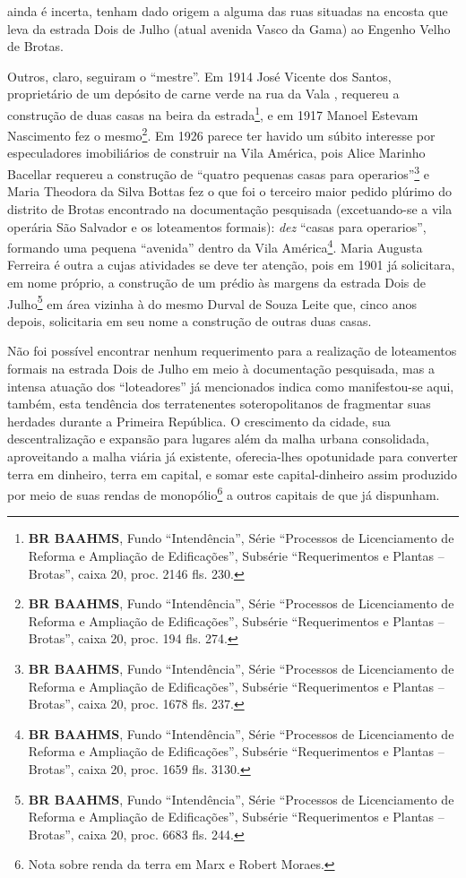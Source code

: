 ainda é incerta, tenham dado origem a alguma das ruas situadas na encosta que leva da estrada Dois de Julho (atual avenida Vasco da Gama) ao Engenho Velho de Brotas.

Outros, claro, seguiram o ``mestre''. Em 1914 José Vicente dos Santos, proprietário de um depósito de carne verde na rua da Vala \cite[p.~402]{reis_almanak_1898}, requereu a construção de duas casas na beira da estrada\footnote{\textbf{BR BAAHMS}, Fundo ``Intendência'', Série ``Processos de Licenciamento de Reforma e Ampliação de Edificações'', Subsérie ``Requerimentos e Plantas -- Brotas'', caixa 20, proc. 2146 fls. 230.}, e em 1917 Manoel Estevam Nascimento fez o mesmo\footnote{\textbf{BR BAAHMS}, Fundo ``Intendência'', Série ``Processos de Licenciamento de Reforma e Ampliação de Edificações'', Subsérie ``Requerimentos e Plantas -- Brotas'', caixa 20, proc. 194 fls. 274.}. Em 1926 parece ter havido um súbito interesse por especuladores imobiliários de construir na Vila América, pois Alice Marinho Bacellar requereu a construção de ``quatro pequenas casas para operarios''\footnote{\textbf{BR BAAHMS}, Fundo ``Intendência'', Série ``Processos de Licenciamento de Reforma e Ampliação de Edificações'', Subsérie ``Requerimentos e Plantas -- Brotas'', caixa 20, proc. 1678 fls. 237.} e Maria Theodora da Silva Bottas fez o que foi o terceiro maior pedido plúrimo do distrito de Brotas encontrado na documentação pesquisada (excetuando-se a vila operária São Salvador e os loteamentos formais): \textit{dez} ``casas para operarios'', formando uma pequena ``avenida'' dentro da Vila América\footnote{\textbf{BR BAAHMS}, Fundo ``Intendência'', Série ``Processos de Licenciamento de Reforma e Ampliação de Edificações'', Subsérie ``Requerimentos e Plantas -- Brotas'', caixa 20, proc. 1659 fls. 3130.}. Maria Augusta Ferreira é outra a cujas atividades se deve ter atenção, pois em 1901 já solicitara, em nome próprio, a construção de um prédio às margens da estrada Dois de Julho\footnote{\textbf{BR BAAHMS}, Fundo ``Intendência'', Série ``Processos de Licenciamento de Reforma e Ampliação de Edificações'', Subsérie ``Requerimentos e Plantas -- Brotas'', caixa 20, proc. 6683 fls. 244.} em área vizinha à do mesmo Durval de Souza Leite que, cinco anos depois, solicitaria em seu nome a construção de outras duas casas.


Não foi possível encontrar nenhum requerimento para a realização de loteamentos formais na estrada Dois de Julho em meio à documentação pesquisada, mas a intensa atuação dos ``loteadores'' já mencionados indica como manifestou-se aqui, também, esta tendência dos terratenentes soteropolitanos de fragmentar suas herdades durante a Primeira República. O crescimento da cidade, sua descentralização e expansão para lugares além da malha urbana consolidada, aproveitando a malha viária já existente, oferecia-lhes opotunidade para converter terra em dinheiro, terra em capital, e somar este capital-dinheiro assim produzido por meio de suas rendas de monopólio\footnote{Nota sobre renda da terra em Marx e Robert Moraes.} a outros capitais de que já dispunham.

